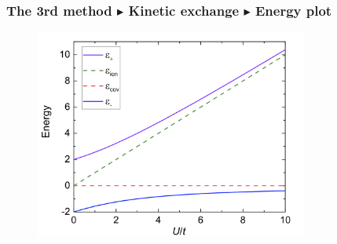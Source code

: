 \documentclass{beamer}
\begin{document}
  \begin{frame}
    \frametitle{The 3rd method \(\blacktriangleright\) Kinetic exchange \(\blacktriangleright\) Energy plot}
    \begin{figure}
      \centering
      \includegraphics[width=0.8\textwidth]{figure/KE.png}
    \end{figure}
  \end{frame}
\end{document}
